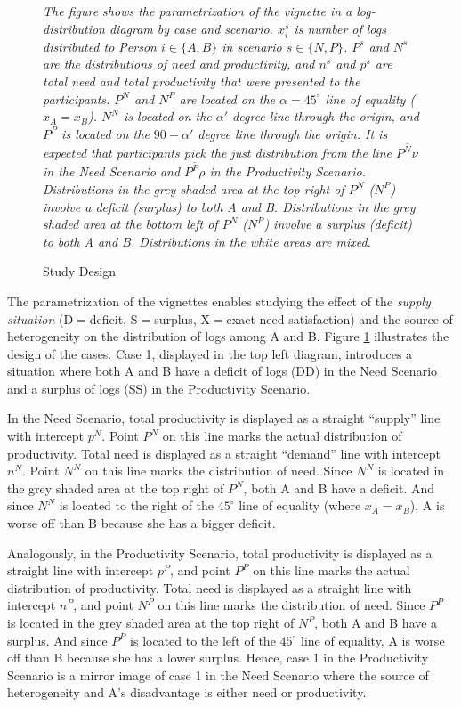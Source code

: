 \documentclass[smallcondensed]{svjour3}
\begin{document}
\begin{figure}[ht!]
\begin{minipage}{12cm}
   \emph{The figure shows the parametrization of the vignette in a log-distribution diagram by case and scenario. $x_i^s$ is number of logs distributed to Person $i\in\{A,B\}$ in scenario $s\in\{N,P\}$. $P^s$ and $N^s$ are the distributions of need and productivity, and $n^s$ and $p^s$ are total need and total productivity that were presented to the participants. $P^N$ and $N^P$ are located on the $\alpha=45^\circ$ line of equality ($x_A=x_B$). $N^N$ is located on the $\alpha'$ degree line through the origin, and $P^P$ is located on the $90-\alpha'$ degree line through the origin. It is expected that participants pick the just distribution from the line $\overline{P^N\nu}$ in the Need Scenario and $\overline{P^P\rho}$ in the Productivity Scenario. Distributions in the grey shaded area at the top right of $P^N$ ($N^P$) involve a deficit (surplus) to both A and B. Distributions in the grey shaded area at the bottom left of $P^N$ ($N^P$) involve a surplus (deficit) to both A and B. Distributions in the white areas are mixed.}
   \caption{Study Design}
   \label{fig:design}
   \end{minipage}
\end{figure}
%
The parametrization of the vignettes enables studying the effect of the \textit{supply situation} (D$=$deficit, S$=$surplus, X$=$exact need satisfaction) and the source of heterogeneity on the distribution of logs among A and B. Figure \ref{fig:design} illustrates the design of the cases. Case 1, displayed in the top left diagram, introduces a situation where both A and B have a deficit of logs (DD) in the Need Scenario and a surplus of logs (SS) in the Productivity Scenario.\par
%
In the Need Scenario, total productivity is displayed as a straight ``supply'' line with intercept $p^N$. Point $P^N$ on this line marks the actual distribution of productivity. Total need is displayed as a straight ``demand'' line with intercept $n^N$. Point $N^N$ on this line marks the distribution of need. Since $N^N$ is located in the grey shaded area at the top right of $P^N$, both A and B have a deficit. And since $N^N$ is located to the right of the $45^\circ$ line of equality (where $x_A=x_B$), A is worse off than B because she has a bigger deficit.\par
%
Analogously, in the Productivity Scenario, total productivity is displayed as a straight line with intercept $p^P$, and point $P^P$ on this line marks the actual distribution of productivity. Total need is displayed as a straight line with intercept $n^P$, and point $N^P$ on this line marks the distribution of need. Since $P^P$ is located in the grey shaded area at the top right of $N^P$, both A and B have a surplus. And since $P^P$ is located to the left of the $45^\circ$ line of equality, A is worse off than B because she has a lower surplus. Hence, case 1 in the Productivity Scenario is a mirror image of case 1 in the Need Scenario where the source of heterogeneity and A's disadvantage is either need or productivity.\par
\end{document}
